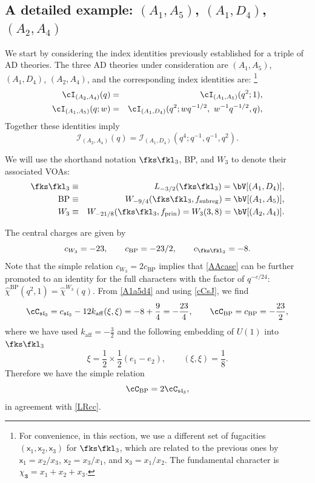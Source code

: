 \documentclass[a4paper,11pt]{article}
\theoremstyle{definition}
\theoremstyle{definition}
\theoremstyle{remark}
\newcommand{\prin}{ \text{prin}}
\newcommand{\be}{\begin{equation}}
\newcommand{\ee}{\end{equation}}
\newcommand{\beqn}{\begin{eqnarray}}
\newcommand{\eeqn}{\end{eqnarray}}
\begin{document}
  \subsection{A detailed example: $(A_1,A_5)$, $(A_1,D_4)$, $(A_2,A_4)$ } 
  We start by considering the index identities  previously established  for a triple of AD theories. The three AD theories under consideration are $(A_1,A_5)$, $(A_1,D_4)$, $(A_2,A_4)$, and the corresponding index identities are:   
   \footnote{For convenience, in this section, we use a different set of fugacities $(\mathsf{x}_1,\mathsf{x}_2,\mathsf{x}_3)$ for $\fks\fkl_3$, which are related to the previous ones by   $\mathsf{x}_1=x_2/x_3$, $\mathsf{x}_2=x_3/x_1$, and $\mathsf{x}_3=x_1/x_2$. The fundamental character is $\chi_{\mathbf3}=x_1+x_2+x_3$.}
  \beqn\label{AAcase}
   \cI_{(A_2,A_4)}(q) &=& \cI_{(A_1,A_5)}(q^2;1)   ,
\\
  \cI_{(A_1,A_5)}(q;w)&=&  \cI_{(A_1,D_4)}(q^2; w q^{-1/2}, \ w^{-1}q^{-1/2}, q  ), 
  \label{A1a5d4}
  \eeqn 
Together these identities imply 
  \be
  \mathcal I_{(A_2,A_4)}(q)
=\mathcal I_{(A_1,D_4)}(q^4;q^{-1},q^{-1},q^2).
  \ee




  We will use the shorthand notation   $\fks\fkl_3$, BP,  and $W_3$   to denote their associated VOAs:
  \beqn
  \fks\fkl_3 & \equiv& L_{-3/2}(\fks\fkl_3)=\bV[(A_1,D_4)], \\
     {\text{BP}}& \equiv& W_{-9/4}(\fks\fkl_3,f_ {\text{subreg}})=\bV[(A_1,A_5)], \\
  W_3& \equiv& W_{-21/8}(\fks\fkl_3,f_\prin)=W_3(3,8)=\bV[(A_2,A_4)].
  \eeqn
   
  The central charges are given by 
  \be\label{cw3bp}
 c_{W_3}=-23, \qquad   c_{ \text{BP}}=-23/2, \qquad  c_{\fks\fkl_3}=-8.
  \ee
 Note that the simple relation $c_{W_3}=2 c_{ \text{BP}}$   implies that  \eqref{AAcase} can be further  promoted to     an identity for the full characters with the factor of $q^{-c/24}$: $ \widehat \chi^{     \text{BP}}(q^2,1)= \widehat \chi^{    W_3}(q)$. From \eqref{A1a5d4} and using \eqref{cCsJ}, we  find
  \be
\cC_{\mathfrak{sl}_3}
=c_{\mathfrak{sl}_3}-12k_{\mathrm{aff}}(\xi,\xi)
=-8+\frac94=-\frac{23}{4},\qquad
\cC_{\mathrm{BP}}=c_{\mathrm{BP}}=-\frac{23}{2},
 \ee 
where we have used $k_{\mathrm{aff}}=-\frac32$ and    the  following embedding of $U(1)$ into $\fks\fkl_3$ 
\be
\xi=\frac12 \times \frac12(e_1-e_2),\qquad (\xi,\xi)=\frac18.
\ee
 Therefore we have the simple relation 
 \be
 \cC_{\mathrm{BP}}=2\cC_{\mathfrak{sl}_3},
 \ee
in agreement with \eqref{LRcc}.
 
\end{document}
